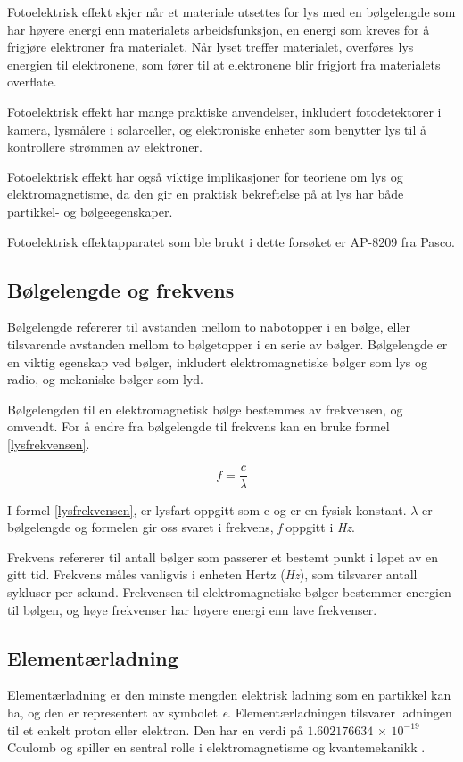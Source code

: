 \documentclass[twocolumn, 11pt]{article} %
\begin{document}
Fotoelektrisk effekt skjer når et materiale utsettes for lys med en bølgelengde som har høyere energi enn materialets arbeidsfunksjon, en energi som kreves for å frigjøre elektroner fra materialet. Når lyset treffer materialet, overføres lys energien til elektronene, som fører til at elektronene blir frigjort fra materialets overflate.

Fotoelektrisk effekt har mange praktiske anvendelser, inkludert fotodetektorer i kamera, lysmålere i solarceller, og elektroniske enheter som benytter lys til å kontrollere strømmen av elektroner.

Fotoelektrisk effekt har også viktige implikasjoner for teoriene om lys og elektromagnetisme, da den gir en praktisk bekreftelse på at lys har både partikkel- og bølgeegenskaper\cite{Einstein}.

Fotoelektrisk effektapparatet som ble brukt i dette forsøket er AP-8209 fra Pasco.

\subsection{Bølgelengde og frekvens}
Bølgelengde refererer til avstanden mellom to nabotopper i en bølge, eller tilsvarende avstanden mellom to bølgetopper i en serie av bølger. Bølgelengde er en viktig egenskap ved bølger, inkludert elektromagnetiske bølger som lys og radio, og mekaniske bølger som lyd\cite{Bølgelengde}. 

Bølgelengden til en elektromagnetisk bølge bestemmes av frekvensen, og omvendt. For å endre fra bølgelengde til frekvens kan en bruke formel \eqref{lysfrekvensen}.

\begin{equation}
    f = \frac{c}{\lambda}
    \label{lysfrekvensen}
\end{equation}

I formel \eqref{lysfrekvensen}, er lysfart oppgitt som c og er en fysisk konstant. $\lambda$ er bølgelengde og formelen gir oss svaret i frekvens, \textit{f} oppgitt i \textit{Hz}.

Frekvens refererer til antall bølger som passerer et bestemt punkt i løpet av en gitt tid. Frekvens måles vanligvis i enheten Hertz (\textit{Hz}), som tilsvarer antall sykluser per sekund. Frekvensen til elektromagnetiske bølger bestemmer energien til bølgen, og høye frekvenser har høyere energi enn lave frekvenser\cite{Frekvens}.

\subsection{Elementærladning}
Elementærladning er den minste mengden elektrisk ladning som en partikkel kan ha, og den er representert av symbolet \textit{e}. Elementærladningen tilsvarer ladningen til et enkelt proton eller elektron. Den har en verdi på $1.602176 634$ × $10^{-19}$ Coulomb og spiller en sentral rolle i elektromagnetisme og kvantemekanikk \cite{elementærladning}.
\end{document}
